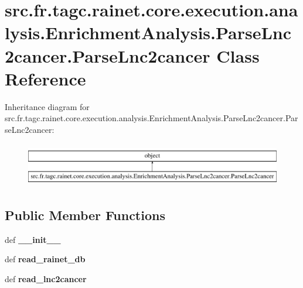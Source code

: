\hypertarget{classsrc_1_1fr_1_1tagc_1_1rainet_1_1core_1_1execution_1_1analysis_1_1EnrichmentAnalysis_1_1ParseLnc2cancer_1_1ParseLnc2cancer}{\section{src.\-fr.\-tagc.\-rainet.\-core.\-execution.\-analysis.\-Enrichment\-Analysis.\-Parse\-Lnc2cancer.\-Parse\-Lnc2cancer Class Reference}
\label{classsrc_1_1fr_1_1tagc_1_1rainet_1_1core_1_1execution_1_1analysis_1_1EnrichmentAnalysis_1_1ParseLnc2cancer_1_1ParseLnc2cancer}
}
Inheritance diagram for src.\-fr.\-tagc.\-rainet.\-core.\-execution.\-analysis.\-Enrichment\-Analysis.\-Parse\-Lnc2cancer.\-Parse\-Lnc2cancer\-:\begin{figure}[H]
\begin{center}
\leavevmode
\includegraphics[height=1.937716cm]{classsrc_1_1fr_1_1tagc_1_1rainet_1_1core_1_1execution_1_1analysis_1_1EnrichmentAnalysis_1_1ParseLnc2cancer_1_1ParseLnc2cancer}
\end{center}
\end{figure}
\subsection*{Public Member Functions}
\begin{DoxyCompactItemize}
\item 
\hypertarget{classsrc_1_1fr_1_1tagc_1_1rainet_1_1core_1_1execution_1_1analysis_1_1EnrichmentAnalysis_1_1ParseLnc2cancer_1_1ParseLnc2cancer_ada377e3c09c9a99cfbc0c5599f79bbae}{def {\bfseries \-\_\-\-\_\-init\-\_\-\-\_\-}}\label{classsrc_1_1fr_1_1tagc_1_1rainet_1_1core_1_1execution_1_1analysis_1_1EnrichmentAnalysis_1_1ParseLnc2cancer_1_1ParseLnc2cancer_ada377e3c09c9a99cfbc0c5599f79bbae}

\item 
\hypertarget{classsrc_1_1fr_1_1tagc_1_1rainet_1_1core_1_1execution_1_1analysis_1_1EnrichmentAnalysis_1_1ParseLnc2cancer_1_1ParseLnc2cancer_abc695a96329351a61cb2e74bf01800b6}{def {\bfseries read\-\_\-rainet\-\_\-db}}\label{classsrc_1_1fr_1_1tagc_1_1rainet_1_1core_1_1execution_1_1analysis_1_1EnrichmentAnalysis_1_1ParseLnc2cancer_1_1ParseLnc2cancer_abc695a96329351a61cb2e74bf01800b6}

\item 
\hypertarget{classsrc_1_1fr_1_1tagc_1_1rainet_1_1core_1_1execution_1_1analysis_1_1EnrichmentAnalysis_1_1ParseLnc2cancer_1_1ParseLnc2cancer_aa2c5b4f9208896668a762caf67ddf6c0}{def {\bfseries read\-\_\-lnc2cancer}}\label{classsrc_1_1fr_1_1tagc_1_1rainet_1_1core_1_1execution_1_1analysis_1_1EnrichmentAnalysis_1_1ParseLnc2cancer_1_1ParseLnc2cancer_aa2c5b4f9208896668a762caf67ddf6c0}

\end{DoxyCompactItemize}
